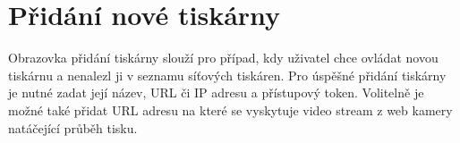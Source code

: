 \section{Přidání nové tiskárny}

Obrazovka přidání tiskárny slouží pro případ, kdy uživatel chce ovládat novou tiskárnu a nenalezl ji v seznamu síťových tiskáren.
Pro úspěšné přidání tiskárny je nutné zadat její název, URL či IP adresu a přístupový token.
Volitelně je možné také přidat URL adresu na které se vyskytuje video stream z web kamery natáčející průběh tisku.
